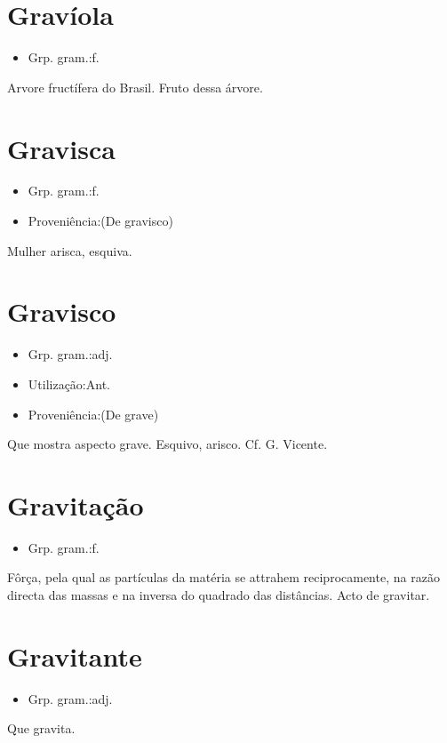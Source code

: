 \section{Gravíola}
\begin{itemize}
\item {Grp. gram.:f.}
\end{itemize}
Arvore fructífera do Brasil.
Fruto dessa árvore.
\section{Gravisca}
\begin{itemize}
\item {Grp. gram.:f.}
\end{itemize}
\begin{itemize}
\item {Proveniência:(De \textunderscore gravisco\textunderscore )}
\end{itemize}
Mulher arisca, esquiva.
\section{Gravisco}
\begin{itemize}
\item {Grp. gram.:adj.}
\end{itemize}
\begin{itemize}
\item {Utilização:Ant.}
\end{itemize}
\begin{itemize}
\item {Proveniência:(De \textunderscore grave\textunderscore )}
\end{itemize}
Que mostra aspecto grave.
Esquivo, arisco. Cf. G. Vicente.
\section{Gravitação}
\begin{itemize}
\item {Grp. gram.:f.}
\end{itemize}
Fôrça, pela qual as partículas da matéria se attrahem reciprocamente, na razão directa das massas e na inversa do quadrado das distâncias.
Acto de gravitar.
\section{Gravitante}
\begin{itemize}
\item {Grp. gram.:adj.}
\end{itemize}
Que gravita.
